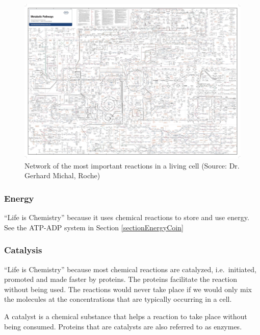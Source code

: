 \documentclass[
  11pt,
]{book}
\begin{document}
\begin{figure}

{\centering \includegraphics[width=1\linewidth]{./figs/roche_pathways} 

}

\caption{Network of the most important reactions in a living cell (Source: Dr. Gerhard Michal, Roche)}\label{fig:chemicalReactionsCell}
\end{figure}

\hypertarget{energy}{%
\subsubsection{Energy}\label{energy}}

``Life is Chemistry'' because it uses chemical reactions to store and use energy. See the ATP-ADP system in Section \ref{sectionEnergyCoin}

\hypertarget{catalysis}{%
\subsubsection{Catalysis}\label{catalysis}}

``Life is Chemistry'' because most chemical reactions are catalyzed, i.e.~initiated, promoted and made faster by proteins. The proteins facilitate the reaction without being used. The reactions would never take place if we would only mix the molecules at the concentrations that are typically occurring in a cell.

A catalyst is a chemical substance that helps a reaction to take place without being consumed. Proteins that are catalysts are also referred to as enzymes.
\end{document}
